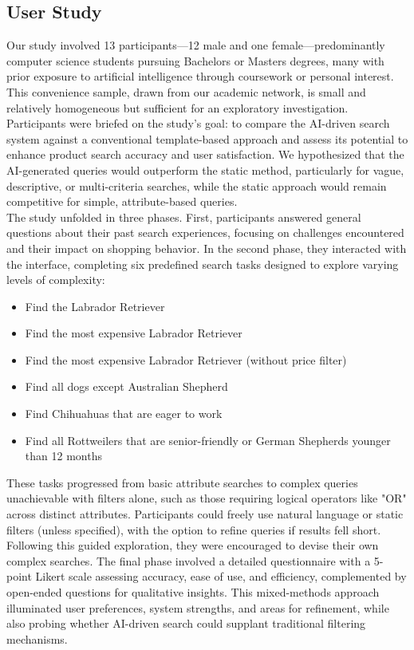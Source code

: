 \documentclass[../../submission.tex]{subfiles}
\begin{document}
\subsection{User Study}
Our study involved 13 participants—12 male and one female—predominantly computer science students pursuing Bachelors or Masters degrees, 
many with prior exposure to artificial intelligence through coursework or personal interest. This convenience sample, drawn from our academic 
network, is small and relatively homogeneous but sufficient for an exploratory investigation. Participants were briefed on the study’s goal: to 
compare the AI-driven search system against a conventional template-based approach and assess its potential to enhance product search accuracy and 
user satisfaction. We hypothesized that the AI-generated queries would outperform the static method, particularly for vague, descriptive, or multi-criteria 
searches, while the static approach would remain competitive for simple, attribute-based queries.\\
The study unfolded in three phases. First, participants answered general questions about their past search experiences, 
focusing on challenges encountered and their impact on shopping behavior. In the second phase, they interacted with the interface, 
completing six predefined search tasks designed to explore varying levels of complexity:
\begin{itemize}
   \item Find the Labrador Retriever
   \item Find the most expensive Labrador Retriever
   \item Find the most expensive Labrador Retriever (without price filter)
   \item Find all dogs except Australian Shepherd
   \item Find Chihuahuas that are eager to work
   \item Find all Rottweilers that are senior-friendly or German Shepherds younger than 12 months
\end{itemize}
These tasks progressed from basic attribute searches to complex queries unachievable with filters alone, 
such as those requiring logical operators like "OR" across distinct attributes. Participants could freely use 
natural language or static filters (unless specified), with the option to refine queries if results fell short. 
Following this guided exploration, they were encouraged to devise their own complex searches. The final phase involved a 
detailed questionnaire with a 5-point Likert scale assessing accuracy, ease of use, and efficiency, complemented by open-ended 
questions for qualitative insights. This mixed-methods approach illuminated user preferences, system strengths, and areas for refinement, 
while also probing whether AI-driven search could supplant traditional filtering mechanisms.
\end{document}

